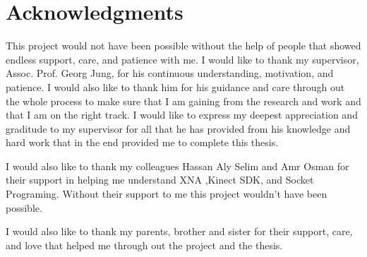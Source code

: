 \chapter*{Acknowledgments}
\label{chap:ack}
This project would not have been possible without the help of people that showed endless support, care, and patience with me. I would like to thank my supervisor, Assoc. Prof. Georg Jung, for his continuous understanding, motivation, and patience. I would also like to thank him for his guidance and care through out the whole process to make sure that I am gaining from the research and work and that I am on the right track. I would like to express my deepest appreciation and graditude to my supervisor for all that he has provided from his knowledge and hard work that in the end provided me to complete this thesis.

I would also like to thank my colleagues Hassan Aly Selim and Amr Osman for their support in helping me understand XNA ,Kinect SDK, and Socket Programing. Without their support to me this project wouldn't have been possible.

I would also like to thank my parents, brother and sister for their support, care, and love that helped me through out the project and the thesis.